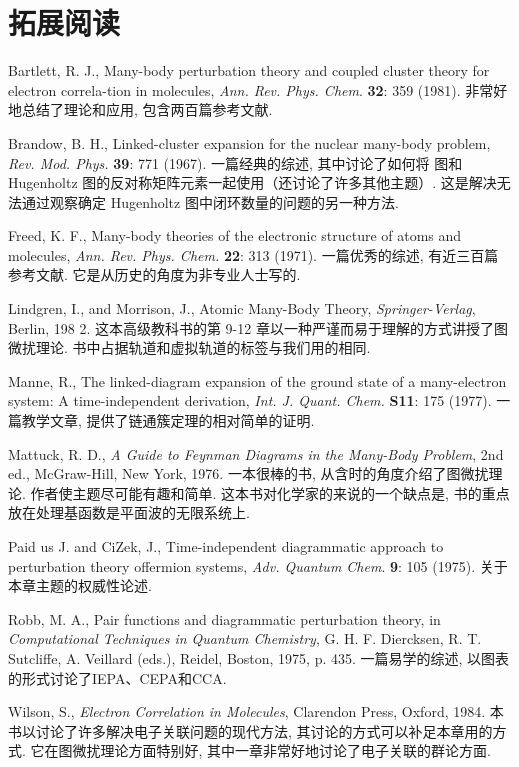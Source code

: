 \theendnotes
{}

\section*{拓展阅读}

Bartlett, R. J., Many-body perturbation theory and coupled cluster theory for electron correla-tion in molecules, \textit{Ann. Rev. Phys. Chem}. \textbf{32}: 359 (1981). 非常好地总结了理论和应用, 包含两百篇参考文献. 

Brandow, B. H., Linked-cluster expansion for the nuclear many-body problem, \textit{Rev. Mod. Phys.} \textbf{39}: 771 (1967). 一篇经典的综述, 其中讨论了如何将 图和 Hugenholtz 图的反对称矩阵元素一起使用（还讨论了许多其他主题）.  这是解决无法通过观察确定 Hugenholtz 图中闭环数量的问题的另一种方法. 

Freed, K. F., Many-body theories of the electronic structure of atoms and molecules, \textit{Ann. Rev. Phys. Chem.} \textbf{22}: 313 (1971). 一篇优秀的综述, 有近三百篇参考文献.  它是从历史的角度为非专业人士写的. 

Lindgren, I., and Morrison, J., Atomic Many-Body Theory, \textit{Springer-Verlag}, Berlin, 198 2. 这本高级教科书的第 9-12 章以一种严谨而易于理解的方式讲授了图微扰理论.  书中占据轨道和虚拟轨道的标签与我们用的相同. 

Manne, R., The linked-diagram expansion of the ground state of a many-electron system: A time-independent derivation, \textit{Int. J. Quant. Chem.} \textbf{S11}: 175 (1977). 一篇教学文章, 提供了链通簇定理的相对简单的证明. 

Mattuck, R. D., \textit{A Guide to Feynman Diagrams in the Many-Body Problem}, 2nd ed., McGraw-Hill, New York, 1976. 一本很棒的书, 从含时的角度介绍了图微扰理论.  作者使主题尽可能有趣和简单.  这本书对化学家的来说的一个缺点是, 书的重点放在处理基函数是平面波的无限系统上. 

Paid us J. and CiZek, J., Time-independent diagrammatic approach to perturbation theory offermion systems, \textit{Adv. Quantum Chem}. \textbf{9}: 105 (1975). 关于本章主题的权威性论述. 

Robb, M. A., Pair functions and diagrammatic perturbation theory, in \textit{Computational Techniques in Quantum Chemistry}, G. H. F. Diercksen, R. T. Sutcliffe, A. Veillard (eds.), Reidel, Boston, 1975, p. 435. 一篇易学的综述, 以图表的形式讨论了IEPA、CEPA和CCA. 

Wilson, S., \textit{Electron Correlation in Molecules}, Clarendon Press, Oxford, 1984. 本书以讨论了许多解决电子关联问题的现代方法, 其讨论的方式可以补足本章用的方式.  它在图微扰理论方面特别好, 其中一章非常好地讨论了电子关联的群论方面. 
